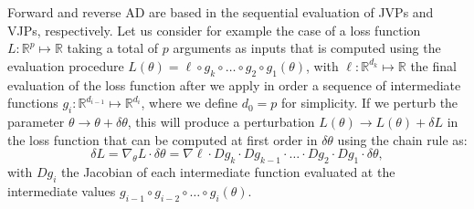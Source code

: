 
Forward and reverse AD are based in the sequential evaluation of JVPs and VJPs, respectively. 
Let us consider for example the case of a loss function $L : \mathbb R^p \mapsto \mathbb R$ taking a total of $p$ arguments as inputs that is computed using the evaluation procedure $L(\theta) = \ell \circ g_{k} \circ \ldots \circ g_2 \circ g_1(\theta)$, with $\ell : \mathbb R^{d_k} \mapsto \mathbb R$ the final evaluation of the loss function after we apply in order a sequence of intermediate functions $g_i : \mathbb R^{d_{i-1}} \mapsto \mathbb R^{d_i}$, where we define $d_0 = p$ for simplicity. 
If we perturb the parameter $\theta \rightarrow \theta + \delta \theta$, this will produce a perturbation $L (\theta) \rightarrow L(\theta) + \delta L$ in the loss function that can be computed at first order in $\delta \theta$ using the chain rule as: 
\begin{equation}
     \delta L = \nabla_\theta L \cdot \delta \theta = \nabla \ell \cdot Dg_{k} \cdot Dg_{k-1} \cdot \ldots \cdot Dg_2 \cdot Dg_1 \cdot \delta \theta , 
    \label{eq:deltaL}
\end{equation}
with $Dg_i$ the Jacobian of each intermediate function evaluated at the intermediate values $g_{i-1} \circ g_{i-2} \circ \ldots \circ g_i (\theta)$.

